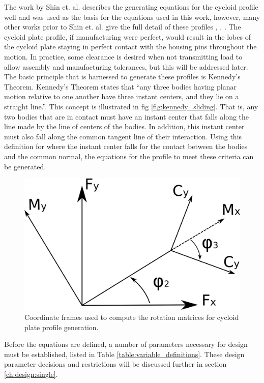 The work by Shin et. al. \cite{ref:on_the_lobe} describes the generating equations for the cycloid profile well and was used as the basis for the equations used in this work, however, many other works prior to Shin et. al. give the full detail of these profiles \cite{ref:malhorta_2}, \cite{ref:hwang_hsieh}, \cite{ref:design_and_application}.
The cycloid plate profile, if manufacturing were perfect, would result in the lobes of the cycloid plate staying in perfect contact with the housing pins throughout the motion. In practice, some clearance is desired when not transmitting load to allow assembly and manufacturing tolerances, but this will be addressed later. The basic principle that is harnessed to generate these profiles is Kennedy's Theorem. Kennedy's Theorem states that ``any three bodies having planar motion relative to one another have three instant centers, and they lie on a straight line.''\cite{ref:kinematics_and_dynamics}. This concept is illustrated in fig \ref{fig:kennedy_sliding}. That is, any two bodies that are in contact must have an instant center that falls along the line made by the line of centers of the bodies. In addition, this instant center must also fall along the common tangent line of their interaction. Using this definition for where the instant center falls for the contact between the bodies and the common normal, the equations for the profile to meet these criteria can be generated. 

\begin{figure}[h]
   \centering
   \includegraphics[width=0.60\linewidth]{fig/single_stage_frames}
   \caption{Coordinate frames used to compute the rotation matrices for cycloid plate profile generation.}
   \label{fig:single_frames}
\end{figure}


Before the equations are defined, a number of parameters necessary for design must be established, listed in Table \ref{table:variable_definitions}. 
These design parameter decisions and restrictions will be discussed further in section \ref{ch:design:single}. 

